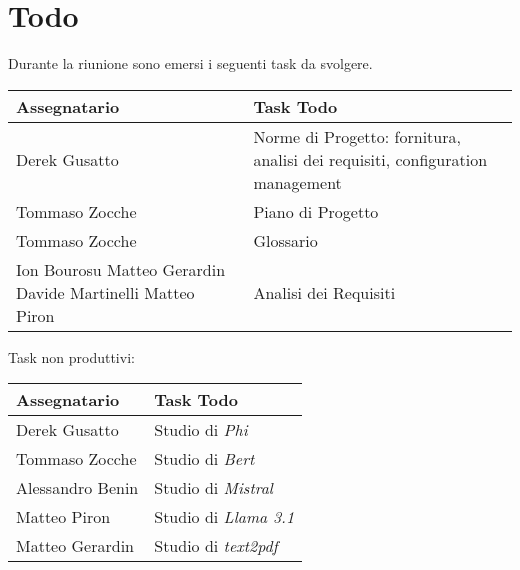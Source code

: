 \section{Todo}
Durante la riunione sono emersi i seguenti task da svolgere.

\begin{center}
  \begin{tabular}{|p{5cm}|p{8cm}|}
    \hline
    \textbf{Assegnatario}       & \textbf{Task Todo} \\ \hline
      Derek Gusatto  &  Norme di Progetto: fornitura, analisi dei requisiti, configuration management\\ \hline
      Tommaso Zocche  &  Piano di Progetto \\ \hline
      Tommaso Zocche  &  Glossario \\ \hline
        Ion Bourosu
    \newline Matteo Gerardin
    \newline Davide Martinelli
    \newline Matteo Piron &   Analisi dei Requisiti \\ \hline
  \end{tabular}
\end{center}

\bigskip
Task non produttivi:
\begin{center}
  \begin{tabular}{|p{5cm}|p{8cm}|}
    \hline
    \textbf{Assegnatario}       & \textbf{Task Todo} \\ \hline
      Derek Gusatto  &  Studio di \textit{Phi}\\ \hline
      Tommaso Zocche  &  Studio di \textit{Bert} \\ \hline
      Alessandro Benin  &  Studio di \textit{Mistral} \\ \hline
       Matteo Piron &   Studio di \textit{Llama 3.1} \\ \hline
       Matteo Gerardin &   Studio di \textit{text2pdf} \\ \hline
  \end{tabular}
\end{center}
